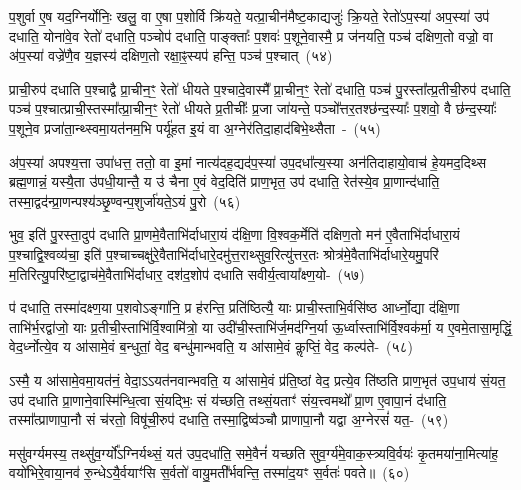 प॒शुर्वा ए॒ष यद॒ग्निर्योनिः॒ खलु॒ वा ए॒षा प॒शोर्वि क्रि॑यते॒ यत्प्रा॒चीन॑मैष्ट॒काद्यजुः॑ क्रि॒यते॒ रेतो॑\-ऽप॒स्या॑ अप॒स्या॑ उप॑ दधाति॒ योना॑वे॒व रेतो॑ दधाति॒ पञ्चोप॑ दधाति॒ पाङ्क्ताः᳚ प॒शवः॑ प॒शूने॒वास्मै॒ प्र ज॑नयति॒ पञ्च॑ दक्षिण॒तो वज्रो॒ वा अ॑प॒स्या॑ वज्रे॑णै॒व य॒ज्ञस्य॑ दक्षिण॒तो रक्षा॒ꣴ॒स्यप॑ हन्ति॒ पञ्च॑ प॒श्चात्~(५४)\ip

प्राची॒रुप॑ दधाति प॒श्चाद्वै प्रा॒चीन॒ꣳ॒ रेतो॑ धीयते प॒श्चादे॒वास्मै᳚ प्रा॒चीन॒ꣳ॒ रेतो॑ दधाति॒ पञ्च॑ पु॒रस्ता᳚त्प्र॒तीची॒रुप॑ दधाति॒ पञ्च॑ प॒श्चात्प्राची॒स्तस्मा᳚त्प्रा॒चीन॒ꣳ॒ रेतो॑ धीयते प्र॒तीचीः᳚ प्र॒जा जा॑यन्ते॒ पञ्चो᳚त्तर॒तश्छ॑न्द॒स्याः᳚ प॒शवो॒ वै छ॑न्द॒स्याः᳚ प॒शूने॒व प्रजा॑ता॒न्थ्स्वमा॒यत॑नम॒भि पर्यू॑हत इ॒यं वा अ॒ग्नेर॑तिदा॒हाद॑बिभे॒थ्सैता~-~(५५)\ip

अ॑प॒स्या॑ अपश्य॒त्ता उपा॑धत्त॒ ततो॒ वा इ॒मां नात्य॑दह॒द्यद॑प॒स्या॑ उप॒दधा᳚त्य॒स्या अन॑ति\-दाहा\-यो॒वाच॑ हे॒यमद॒दिथ्स ब्रह्म॒णान्नं॒ यस्यै॒ता उ॑पधी॒यान्तै॒ य उ॑ चैना ए॒वं वेद॒दिति॑ प्राण॒भृत॒ उप॑ दधाति॒ रेत॑स्ये॒व प्रा॒णान्द॑धाति॒ तस्मा॒द्वद॑न्प्रा॒णन्पश्य॑ञ्छृ॒ण्वन्प॒शुर्जा॑यते॒\-ऽयं पु॒रो~(५६)\ip

भुव॒ इति॑ पु॒रस्ता॒दुप॑ दधाति प्रा॒णमे॒वैताभि॑र्दाधारा॒यं द॑क्षि॒णा वि॒श्वक॒र्मेति॑ दक्षिण॒तो मन॑ ए॒वैताभि॑र्दाधारा॒यं प॒श्चाद्वि॒श्वव्य॑चा॒ इति॑ प॒श्चाच्चक्षु॑रे॒वैताभि॑र्दाधारे॒दमु॑त्त॒राथ्सुव॒रित्यु॑त्तर॒तः श्रोत्र॑मे॒वैताभि॑र्दाधारे॒यमु॒परि॑ म॒तिरित्यु॒परि॑ष्टा॒द्वाच॑मे॒वैताभि॑र्दाधार॒ दश॑द॒शोप॑ दधाति सवीर्य॒त्वाया᳚क्ष्ण॒यो-~(५७)\ip

प॑ दधाति॒ तस्मा॑दक्ष्ण॒या प॒शवो\-ऽङ्गा॑नि॒ प्र ह॑रन्ति॒ प्रति॑ष्ठित्यै॒ याः प्राची॒स्ताभि॒र्वसि॑ष्ठ आर्ध्नो॒द्या द॑क्षि॒णा ताभि॑र्भ॒रद्वा॑जो॒ याः प्र॒तीची॒स्ताभि॑र्वि॒श्वामि॑त्रो॒ या उदी॑ची॒स्ताभि॑र्ज॒मद॑ग्नि॒र्या ऊ॒र्ध्वास्ताभि॑र्वि॒श्वक॑र्मा॒ य ए॒वमे॒तासा॒मृद्धिं॒ वेद॒र्ध्नोत्ये॒व य आ॑सामे॒वं ब॒न्धुतां॒ वेद॒ बन्धु॑मान्भवति॒ य आ॑सामे॒वं कॢप्तिं॒ वेद॒ कल्प॑ते-~(५८)\ip

ऽस्मै॒ य आ॑सामे॒वमा॒यत॑नं॒ वेदा॒\-ऽऽ\-यत॑नवान्भवति॒ य आ॑सामे॒वं प्र॑ति॒ष्ठां वेद॒ प्रत्ये॒व ति॑ष्ठति प्राण॒भृत॑ उप॒धाय॑ सं॒यत॒ उप॑ दधाति प्रा॒णाने॒वास्मि॑न्धि॒त्वा सं॒यद्भिः॒ सं य॑च्छति॒ तथ्सं॒यताꣳ॑ संय॒त्त्वमथो᳚ प्रा॒ण ए॒वापा॒नं द॑धाति॒ तस्मा᳚त्प्राणापा॒नौ सं च॑रतो॒ विषू॑ची॒रुप॑ दधाति॒ तस्मा॒द्विष्व॑ञ्चौ प्राणापा॒नौ यद्वा अ॒ग्नेरसं॑ यत॒-~(५९)\ip

मसु॑वर्ग्यमस्य॒ तथ्सु॑व॒र्ग्यो᳚\-ऽग्निर्यथ्सं॒ यत॑ उप॒\-दधा॑ति॒ समे॒वैनं॑ यच्छति सुव॒र्ग्य॑मे॒वाक॒\-स्त्र्यवि॒र्वयः॑ कृ॒तमया॑ना॒मित्या॑ह॒ वयो॑भिरे॒वाया॒नव॑ रु॒न्धे\-ऽयै॒र्वयाꣳ॑सि स॒र्वतो॑ वायु॒मती᳚र्भवन्ति॒ तस्मा॑द॒यꣳ स॒र्वतः॑ पवते॥~(६०)\ip

